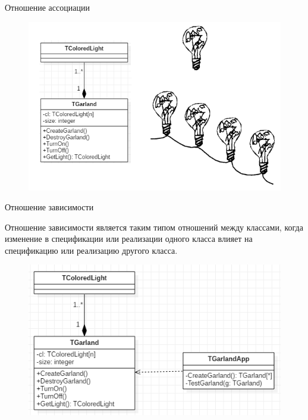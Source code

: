 \documentclass{beamer}
\begin{document}
\begin{frame}{Отношение ассоциации}
\begin{figure}[h]
\centering
\includegraphics[scale=0.75]{images/lec04-pic14.png}
\end{figure}
\end{frame}

\begin{frame}{Отношение зависимости}
\begin{block}{Отношение зависимости}
является таким типом отношений между классами, когда изменение в спецификации или реализации одного класса влияет на спецификацию или реализацию другого класса.
\end{block}
\begin{figure}[h]
\centering
\includegraphics[scale=0.6]{images/lec04-pic18.png}
\end{figure}
\end{frame}
\end{document}

